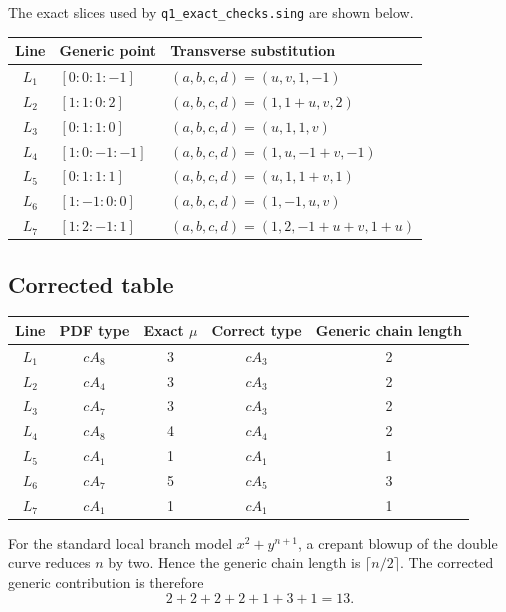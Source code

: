 \documentclass[11pt]{article}
\newcommand{\wrong}[1]{\textcolor{mistakered}{#1}}
\begin{document}
The exact slices used by \texttt{q1\_exact\_checks.sing} are shown below.

\begin{center}
\small
\begin{tabular}{@{}cll@{}}
\toprule
Line & Generic point & Transverse substitution \\
\midrule
$L_1$ & $[0:0:1:-1]$ & $(a,b,c,d)=(u,v,1,-1)$ \\
$L_2$ & $[1:1:0:2]$ & $(a,b,c,d)=(1,1+u,v,2)$ \\
$L_3$ & $[0:1:1:0]$ & $(a,b,c,d)=(u,1,1,v)$ \\
$L_4$ & $[1:0:-1:-1]$ & $(a,b,c,d)=(1,u,-1+v,-1)$ \\
$L_5$ & $[0:1:1:1]$ & $(a,b,c,d)=(u,1,1+v,1)$ \\
$L_6$ & $[1:-1:0:0]$ & $(a,b,c,d)=(1,-1,u,v)$ \\
$L_7$ & $[1:2:-1:1]$ & $(a,b,c,d)=(1,2,-1+u+v,1+u)$ \\
\bottomrule
\end{tabular}
\end{center}

\subsection{Corrected table}

\begin{center}
\begin{tabular}{@{}ccccc@{}}
\toprule
Line & PDF type & Exact $\mu$ & Correct type & Generic chain length \\
\midrule
$L_1$ & \wrong{$cA_8$} & 3 & $cA_3$ & 2 \\
$L_2$ & \wrong{$cA_4$} & 3 & $cA_3$ & 2 \\
$L_3$ & \wrong{$cA_7$} & 3 & $cA_3$ & 2 \\
$L_4$ & \wrong{$cA_8$} & 4 & $cA_4$ & 2 \\
$L_5$ & $cA_1$ & 1 & $cA_1$ & 1 \\
$L_6$ & \wrong{$cA_7$} & 5 & $cA_5$ & 3 \\
$L_7$ & $cA_1$ & 1 & $cA_1$ & 1 \\
\bottomrule
\end{tabular}
\end{center}

For the standard local branch model $x^2+y^{n+1}$, a crepant blowup of the double curve
reduces $n$ by two.  Hence the generic chain length is $\lceil n/2\rceil$.  The corrected
generic contribution is therefore
\[
  2+2+2+2+1+3+1=13.
\]
\end{document}
